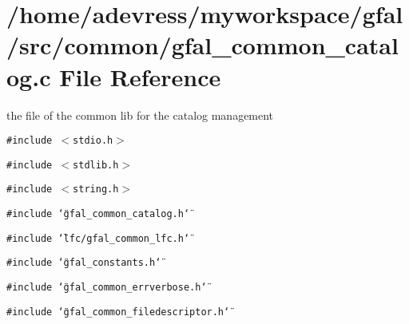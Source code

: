 \section{/home/adevress/myworkspace/gfal/src/common/gfal\_\-common\_\-catalog.c File Reference}
\label{gfal__common__catalog_8c}
the file of the common lib for the catalog management 

{\tt \#include $<$stdio.h$>$}\par
{\tt \#include $<$stdlib.h$>$}\par
{\tt \#include $<$string.h$>$}\par
{\tt \#include \char`\"{}gfal\_\-common\_\-catalog.h\char`\"{}}\par
{\tt \#include \char`\"{}lfc/gfal\_\-common\_\-lfc.h\char`\"{}}\par
{\tt \#include \char`\"{}gfal\_\-constants.h\char`\"{}}\par
{\tt \#include \char`\"{}gfal\_\-common\_\-errverbose.h\char`\"{}}\par
{\tt \#include \char`\"{}gfal\_\-common\_\-filedescriptor.h\char`\"{}}\par
